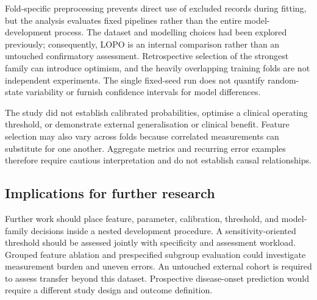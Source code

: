 Fold-specific preprocessing prevents direct use of excluded records during fitting, but the analysis evaluates fixed pipelines rather than the entire model-development process. The dataset and modelling choices had been explored previously; consequently, LOPO is an internal comparison rather than an untouched confirmatory assessment. Retrospective selection of the strongest family can introduce optimism, and the heavily overlapping training folds are not independent experiments. The single fixed-seed run does not quantify random-state variability or furnish confidence intervals for model differences.

The study did not establish calibrated probabilities, optimise a clinical operating threshold, or demonstrate external generalisation or clinical benefit. Feature selection may also vary across folds because correlated measurements can substitute for one another. Aggregate metrics and recurring error examples therefore require cautious interpretation and do not establish causal relationships.

\subsection{Implications for further research}
Further work should place feature, parameter, calibration, threshold, and model-family decisions inside a nested development procedure. A sensitivity-oriented threshold should be assessed jointly with specificity and assessment workload. Grouped feature ablation and prespecified subgroup evaluation could investigate measurement burden and uneven errors. An untouched external cohort is required to assess transfer beyond this dataset. Prospective disease-onset prediction would require a different study design and outcome definition.
